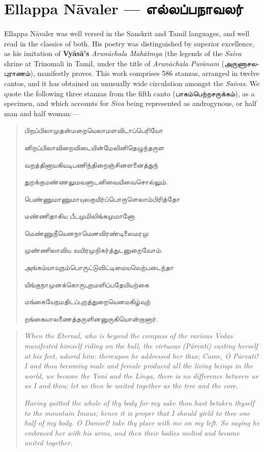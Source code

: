 \documentclass{article}
\newcommand{\TamilText}[1]{\texttamil{#1}}
\newcommand{\TamilBold}[1]{\texttamil{\textbf{#1}}}
\newcommand{\tam}[1]{\TamilText{#1}}
\newcommand{\tambold}[1]{\TamilBold{#1}}
\begin{document}
\section{Ellappa N\={a}valer --- \tambold{எல்லப்பநாவலர்}}
\paragraph{}
Ellappa N\={a}valer was well versed in the Sanskrit and Tamil languages, and well read in the classics of both. His poetry was distinguished by superior excellence, as his imitation of \textbf{Vy\={a}s\={a}'s} \emph{Arun\={a}chala Mah\={a}tmya} (the legends of the \emph{Saiva} shrine at Trinomali in Tamil, under the title of \emph{Arun\={a}chala Pur\={a}nam} (\tam{அருணாசலபுராணம்}), manifestly proves. This work comprises 586 stanzas, arranged in twelve cantos, and it has obtained an unusually wide circulation amongst the \emph{Saivas}. We quote the following three stanzas from the fifth canto (\tam{பாகம்பெற்றசருக்கம்}), as a specimen, and which accounts for \emph{Siva} being represented as androgynous, or half man and half woman:---
\begin{quotation}\small
\tam{பிறப்‌பிலாமுதன்மறையெலாமளவிடாப்பெரியோ}

\tam{னிறப்‌பிலாவிறைவிடையின்மேலினிதெழுந்தருள}

\tam{வறத்தினாயகியடிபணிந்திறைஞ்சினளனைத்துந்}

\tam{துறக்குமண்ணலுமவளுடனிவையிவைசொல்லும்‌}.

\bigskip

\tam{பெண்ணுமாணுமாயுலகுயிர்ப்பொருளெலாம்பிரித்தோ}

\tam{மண்ணிதாகிய பீடமுமிலிங்கமுமானோ}

\tam{மெண்ணுநீயெனநாமெனவிரண்டிலைமரமு}

\tam{முண்ணிலாவிய வயிரமுநிகர்த்துடனுறைவோம்‌}.

\bigskip

\tam{அங்கம்யாவுநம்பொருட்டுவிட்டிமையவெற்படைந்தா}

\tam{யிங்குநாமுனக்கொருபுறமளிப்பதேயியற்கை}

\tam{மங்கையேநமதிடப்புறத்துறையெனமகிழ்வுற்‌}

\tam{றங்கையாலணைத்தருளினனுருகியொன்றானார்‌}.
\end{quotation}
\begin{quotation}\small
\emph{When the Eternal, who is beyond the compass of the various Vedas manifested himself riding on the bull, the virtuous (P\={a}rvati) casting herself at his feet, adored him: thereupon he addressed her thus; Come, O P\={a}rvati! I and thou becoming male and female produced all the living beings in the world, we became the Yoni and the Linga, there is no difference between us as I and thou; let us then be united together as the tree and the core.}

\emph{Having quitted the whole of thy body for my sake thou hast betaken thyself to the mountain Imaus; hence it is proper that I should yield to thee one half of my body. O Damsel! take thy place with me on my left. So saying he embraced her with his arms, and then their bodies melted and became united together.}
\end{quotation}
\end{document}
